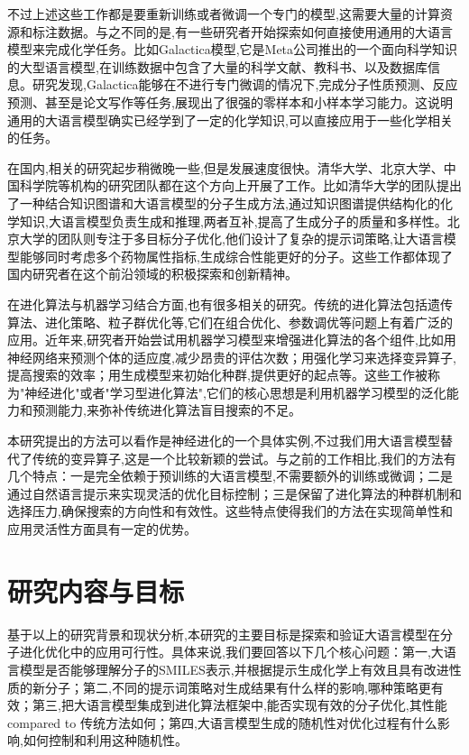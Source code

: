 不过上述这些工作都是要重新训练或者微调一个专门的模型,这需要大量的计算资源和标注数据。与之不同的是,有一些研究者开始探索如何直接使用通用的大语言模型来完成化学任务。比如Galactica模型,它是Meta公司推出的一个面向科学知识的大型语言模型,在训练数据中包含了大量的科学文献、教科书、以及数据库信息\cite{taylor2022galactica}。研究发现,Galactica能够在不进行专门微调的情况下,完成分子性质预测、反应预测、甚至是论文写作等任务,展现出了很强的零样本和小样本学习能力。这说明通用的大语言模型确实已经学到了一定的化学知识,可以直接应用于一些化学相关的任务。

在国内,相关的研究起步稍微晚一些,但是发展速度很快。清华大学、北京大学、中国科学院等机构的研究团队都在这个方向上开展了工作。比如清华大学的团队提出了一种结合知识图谱和大语言模型的分子生成方法,通过知识图谱提供结构化的化学知识,大语言模型负责生成和推理,两者互补,提高了生成分子的质量和多样性\cite{wang2024knowledge}。北京大学的团队则专注于多目标分子优化,他们设计了复杂的提示词策略,让大语言模型能够同时考虑多个药物属性指标,生成综合性能更好的分子\cite{liu2024multi}。这些工作都体现了国内研究者在这个前沿领域的积极探索和创新精神。

在进化算法与机器学习结合方面,也有很多相关的研究。传统的进化算法包括遗传算法、进化策略、粒子群优化等,它们在组合优化、参数调优等问题上有着广泛的应用\cite{holland1992genetic,eiben2015introduction}。近年来,研究者开始尝试用机器学习模型来增强进化算法的各个组件,比如用神经网络来预测个体的适应度,减少昂贵的评估次数；用强化学习来选择变异算子,提高搜索的效率；用生成模型来初始化种群,提供更好的起点等\cite{karafotias2014parameter}。这些工作被称为"神经进化"或者"学习型进化算法",它们的核心思想是利用机器学习模型的泛化能力和预测能力,来弥补传统进化算法盲目搜索的不足。

本研究提出的方法可以看作是神经进化的一个具体实例,不过我们用大语言模型替代了传统的变异算子,这是一个比较新颖的尝试。与之前的工作相比,我们的方法有几个特点：一是完全依赖于预训练的大语言模型,不需要额外的训练或微调；二是通过自然语言提示来实现灵活的优化目标控制；三是保留了进化算法的种群机制和选择压力,确保搜索的方向性和有效性。这些特点使得我们的方法在实现简单性和应用灵活性方面具有一定的优势。

\section{研究内容与目标}

基于以上的研究背景和现状分析,本研究的主要目标是探索和验证大语言模型在分子进化优化中的应用可行性。具体来说,我们要回答以下几个核心问题：第一,大语言模型是否能够理解分子的SMILES表示,并根据提示生成化学上有效且具有改进性质的新分子；第二,不同的提示词策略对生成结果有什么样的影响,哪种策略更有效；第三,把大语言模型集成到进化算法框架中,能否实现有效的分子优化,其性能 compared to 传统方法如何；第四,大语言模型生成的随机性对优化过程有什么影响,如何控制和利用这种随机性。

